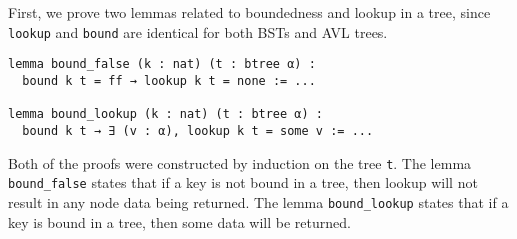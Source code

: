 First, we prove two lemmas related to boundedness and lookup in a tree, since \lstinline{lookup} and \lstinline{bound} are identical for both BSTs and AVL trees.

\begin{lstlisting}
lemma bound_false (k : nat) (t : btree α) :
  bound k t = ff → lookup k t = none := ...

lemma bound_lookup (k : nat) (t : btree α) :
  bound k t → ∃ (v : α), lookup k t = some v := ...
\end{lstlisting}

Both of the proofs were constructed by induction on the tree \lstinline{t}. The lemma \lstinline{bound_false} states that if a key is not bound in a tree, then lookup will not result in any node data being returned. The lemma \lstinline{bound_lookup} states that if a key is bound in a tree, then some data will be returned.